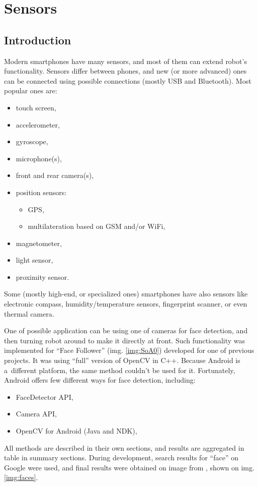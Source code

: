 \chapter{Sensors}

\section{Introduction}
Modern smartphones have many sensors, and most of them can extend robot's
functionality.
Sensors differ between phones, and new (or more advanced) ones can
be connected using possible connections (mostly USB and Bluetooth).
Most popular ones are:
\begin{itemize}
  \item touch screen,
  \item accelerometer,
  \item gyroscope,
  \item microphone(s),
  \item front and rear camera(s),
  \item position sensors:
  \begin{itemize}
    \item GPS,
    \item multilateration based on GSM and/or WiFi,
  \end{itemize}
  \item magnetometer,
  \item light sensor,
  \item proximity sensor.
\end{itemize}
Some (mostly high-end, or specialized ones) smartphones have also sensors like
electronic compass, humidity/temperature sensors, fingerprint scanner, or even
thermal camera.

One of possible application can be using one of cameras for face detection, and
then turning robot around to make it directly at front. 
Such functionality was implemented for ``Face Follower'' (img. \ref{img:SoA0})
developed for one of previous projects. 
It was using ``full'' version of OpenCV in C++. 
Because Android is a~different platform, the same method couldn't be used for
it.
Fortunately, Android offers few different ways for face detection, including:
\begin{itemize}
  \item FaceDetector API,
  \item Camera API,
  \item OpenCV for Android (Java and NDK),
\end{itemize}
All methods are described in their own sections, and results are aggregated in
table in summary sections. 
During development, search results for ``face'' on Google were used, and final
results were obtained on image from \cite{faces}, shown on img. \ref{img:faces}.

